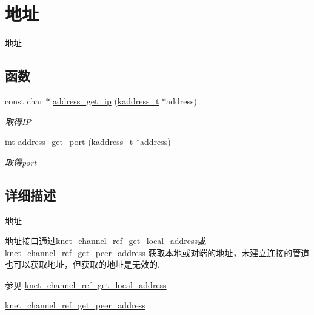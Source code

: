 \hypertarget{a00107}{}\section{地址}
\label{a00107}


地址  


\subsection*{函数}
\begin{DoxyCompactItemize}
\item 
const char $\ast$ \hyperlink{a00107_gaa1ea22192168bb6baea88feeb20eb601_gaa1ea22192168bb6baea88feeb20eb601}{address\+\_\+get\+\_\+ip} (\hyperlink{a00054_a44e99fab0348ec54cfee119ddd9ceed6_a44e99fab0348ec54cfee119ddd9ceed6}{kaddress\+\_\+t} $\ast$address)
\begin{DoxyCompactList}\small\item\em 取得\+I\+P \end{DoxyCompactList}\item 
int \hyperlink{a00107_ga9acaa00fe11bcecadea350baf9da7172_ga9acaa00fe11bcecadea350baf9da7172}{address\+\_\+get\+\_\+port} (\hyperlink{a00054_a44e99fab0348ec54cfee119ddd9ceed6_a44e99fab0348ec54cfee119ddd9ceed6}{kaddress\+\_\+t} $\ast$address)
\begin{DoxyCompactList}\small\item\em 取得port \end{DoxyCompactList}\end{DoxyCompactItemize}


\subsection{详细描述}
地址 


\begin{DoxyPre}
地址接口通过knet\_channel\_ref\_get\_local\_address或knet\_channel\_ref\_get\_peer\_address
获取本地或对端的地址，未建立连接的管道也可以获取地址，但获取的地址是无效的.
\end{DoxyPre}
 \begin{DoxySeeAlso}{参见}
\hyperlink{a00109_gaddc78bbbcee3974d351c2c1ec0340e3e_gaddc78bbbcee3974d351c2c1ec0340e3e}{knet\+\_\+channel\+\_\+ref\+\_\+get\+\_\+local\+\_\+address} 

\hyperlink{a00109_gac54b0999f21b2f481f7b8ebd17699655_gac54b0999f21b2f481f7b8ebd17699655}{knet\+\_\+channel\+\_\+ref\+\_\+get\+\_\+peer\+\_\+address} 
\end{DoxySeeAlso}



